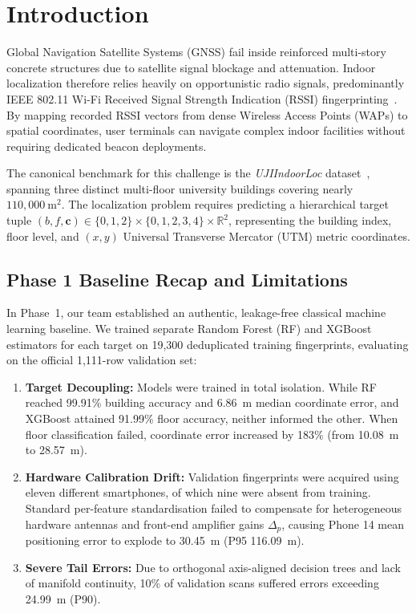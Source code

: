 \documentclass[conference]{IEEEtran}
\begin{document}
\section{Introduction}
Global Navigation Satellite Systems (GNSS) fail inside reinforced multi-story concrete structures due to satellite signal blockage and attenuation. Indoor localization therefore relies heavily on opportunistic radio signals, predominantly IEEE 802.11 Wi-Fi Received Signal Strength Indication (RSSI) fingerprinting~\cite{torres2014ujiindoorloc}. By mapping recorded RSSI vectors from dense Wireless Access Points (WAPs) to spatial coordinates, user terminals can navigate complex indoor facilities without requiring dedicated beacon deployments.

The canonical benchmark for this challenge is the \textit{UJIIndoorLoc} dataset~\cite{torres2014ujiindoorloc}, spanning three distinct multi-floor university buildings covering nearly $110{,}000~\text{m}^2$. The localization problem requires predicting a hierarchical target tuple $(b, f, \mathbf{c}) \in \{0,1,2\} \times \{0,1,2,3,4\} \times \mathbb{R}^2$, representing the building index, floor level, and $(x, y)$ Universal Transverse Mercator (UTM) metric coordinates.

\subsection{Phase 1 Baseline Recap and Limitations}
In Phase~1, our team established an authentic, leakage-free classical machine learning baseline. We trained separate Random Forest (RF) and XGBoost estimators for each target on 19,300 deduplicated training fingerprints, evaluating on the official 1,111-row validation set:
\begin{enumerate}
    \item \textbf{Target Decoupling:} Models were trained in total isolation. While RF reached 99.91\% building accuracy and 6.86~m median coordinate error, and XGBoost attained 91.99\% floor accuracy, neither informed the other. When floor classification failed, coordinate error increased by 183\% (from 10.08~m to 28.57~m).
    \item \textbf{Hardware Calibration Drift:} Validation fingerprints were acquired using eleven different smartphones, of which nine were absent from training. Standard per-feature standardisation failed to compensate for heterogeneous hardware antennas and front-end amplifier gains $\Delta_p$, causing Phone 14 mean positioning error to explode to 30.45~m (P95 116.09~m).
    \item \textbf{Severe Tail Errors:} Due to orthogonal axis-aligned decision trees and lack of manifold continuity, 10\% of validation scans suffered errors exceeding 24.99~m (P90).
\end{enumerate}
\end{document}
